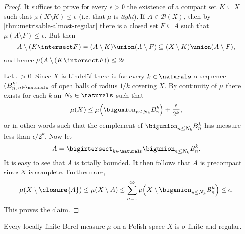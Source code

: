 \documentclass[article, a4paper, 11pt, oneside]{memoir}
\numberwithin{equation}{chapter}
\newcommand{\calB}{\mathcal{B}}
\newcommand{\borel}[1]{\calB(#1)}
\begin{document}
\begin{proof}
    It suffices to prove for every $\epsilon > 0$ the existence of a compact set $K \subseteq X$ such that $\mu(X \setminus K) \leq \epsilon$ (i.e. that $\mu$ is \emph{tight}). If $A \in \borel{X}$, then by \cref{thm:metrisable-almost-regular} there is a closed set $F \subseteq A$ such that $\mu(A \setminus F) \leq \epsilon$. But then
    \begin{equation*}
        A \setminus (K \intersect F)
            = (A \setminus K) \union (A \setminus F)
            \subseteq (X \setminus K) \union (A \setminus F),
    \end{equation*}
    and hence $\mu(A \setminus (K \intersect F)) \leq 2\epsilon$.

    Let $\epsilon > 0$. Since $X$ is Lindelöf there is for every $k \in \naturals$ a sequence $(B_n^k)_{n \in \naturals}$ of open balls of radius $1/k$ covering $X$. By continuity of $\mu$ there exists for each $k$ an $N_k \in \naturals$ such that
    \begin{equation*}
        \mu(X)
            \leq \mu \Bigl( \bigunion_{n \leq N_k} B_n^k \Bigr) + \frac{\epsilon}{2^k},
    \end{equation*}
    or in other words such that the complement of $\bigunion_{n \leq N_k} B_n^k$ has measure less than $\epsilon/2^k$. Now let
    \begin{equation*}
        A
            = \bigintersect_{k \in \naturals}
              \bigunion_{n \leq N_k} B_n^k.
    \end{equation*}
    It is easy to see that $A$ is totally bounded. It then follows that $A$ is precompact since $X$ is complete. Furthermore,
    \begin{equation*}
        \mu(X \setminus \closure{A})
            \leq \mu(X \setminus A)
            \leq \sum_{n=1}^\infty \mu \Bigl( X \setminus \bigunion_{n \leq N_k} B_n^k \Bigr)
            \leq \epsilon.
    \end{equation*}
    This proves the claim.
\end{proof}


\begin{theorem}
    Every locally finite Borel measure $\mu$ on a Polish space $X$ is $\sigma$-finite and regular.
\end{theorem}

\newcommand{\mylistlabelfont}[1]{{\normalfont\color{linkcolor}\textit{#1}:}}
\end{document}
